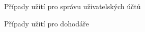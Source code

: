 \documentclass[twoside]{ctuthesis}
\begin{document}
\begin{figure}[h!]


	\caption{Případy užití pro správu uživatelských účtů}
	\label{fig:uc-account}
\end{figure}

\begin{figure}[p!]
		
		\caption{Případy užití pro dohodáře}
		\label{fig:uc-employee}
\end{figure}


\newpage
%
%
%
%
\end{document}
